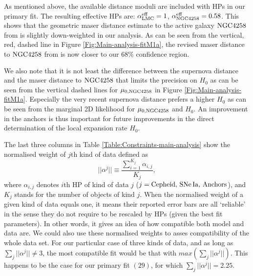 As mentioned above, the available distance moduli are included with HPs in our primary fit. The resulting effective HPs are: $\alpha^{\mathrm{eff}}_{\mathrm{LMC}}=1$, $\alpha^{\mathrm{eff}}_{\mathrm{NGC4258}}=0.58$. This shows that the geometric maser distance estimate to the active galaxy $\mathrm{NGC4258}$ from \cite{Humphreys:2013eja} is slightly down-weighted in our analysis.  As can be seen from the vertical, red, dashed line in Figure \ref{Fig:Main-analysis-fitM1a}, the revised maser distance to $\mathrm{NGC4258}$  from \cite{Riess:2016jrr} is now closer to our $68\%$ confidence region.     

We also note that it is not least the difference between the supernova distance \cite{Polshaw:2015ika} and
the maser distance \cite{Humphreys:2013eja} to $\mathrm{NGC4258}$ that limits the precision on $H_0$ as can be seen from the vertical dashed lines
for $\mu_{0,\mathrm{NGC4258}}$ in Figure \ref{Fig:Main-analysis-fitM1a}. Especially the very recent supernova distance prefers a higher $H_0$ as can be seen
from the marginal 2D likelihood for $\mu_{0,\mathrm{NGC4258}}$ and $H_0$. An improvement in the anchors is thus important for future improvements in the
direct determination of the local expansion rate $H_0$. %

The last three columns in Table \ref{Table:Constraints-main-analysis} show the normalised weight of $j\mathrm{th}$ kind of data  defined as 
\begin{equation}
|| \alpha^{j} || \equiv \frac{\sum_{i=1}^{K_j} \alpha_{i,j}}{K_j},
\label{Eq:normalised-weights}
\end{equation} 
where $\alpha_{i,j}$ denotes $i\mathrm{th}$ HP of kind of data $j$ ($j=\mathrm{Cepheid},\,\mathrm{SNe\,Ia},\,\mathrm{Anchors}$), and $K_j$ stands for the number of objects of kind $j$. When the normalised weight of a given kind of data equals one, it means their reported error bars are all `reliable' in the sense they do not require to be rescaled by HPs (given the best fit parameters). In other words, it gives an idea of how compatible both model and data are. We could also use these normalised weights to asses compatibility of the whole data set. For our particular case of three kinds of data, and as long as $\sum_j|| \alpha^{j} ||\neq 3$, the most compatible fit would be that with $max(\sum_j|| \alpha^{j} ||)$. This happens to be the case for our primary fit $(29)$, for which  $\sum_j|| \alpha^{j}||=2.25$. 

